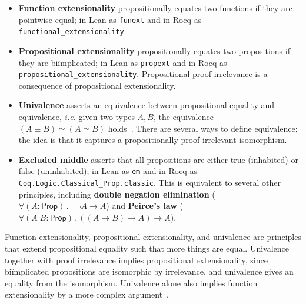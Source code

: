 \documentclass{article}
\makeatletter
\newcommand{\ie}{\textit{i.e.}\@\xspace}
\newcommand{\kw}[1]{\mathsf{#1}}
\newcommand{\code}[1]{\texttt{#1}}
\makeatother
\begin{document}
\begin{itemize}[noitemsep,topsep=0pt]
  \item \textbf{Function extensionality}
    propositionally equates two functions if they are pointwise equal;
    in Lean as \code{funext} and in Rocq as \code{functional\_extensionality}.
  \item \textbf{Propositional extensionality}
    propositionally equates two propositions if they are bi\"implicated;
    in Lean as \code{propext} and in Rocq as \code{propositional\_extensionality}.
    Propositional proof irrelevance is a consequence of propositional extensionality.
  \item \textbf{Univalence}
    asserts an equivalence between propositional equality and equivalence,
    \ie given two types $A, B$,
    the equivalence $(A \equiv B) \simeq (A \simeq B)$ holds~\citep{hott}.
    There are several ways to define equivalence;
    the idea is that it captures a propositionally proof-irrelevant isomorphism.
  \item \textbf{Excluded middle}
    asserts that all propositions are either true (inhabited) or false (uninhabited);
    in Lean as \code{em} and in Rocq as \code{Coq.Logic.Classical\_Prop.classic}.
    This is equivalent to several other principles,
    including \textbf{double negation elimination}
    ($\forall (A : \kw{Prop})\mathpunct{.} \neg \neg A \to A$)
    and \textbf{Peirce's law}
    ($\forall (A \; B : \kw{Prop})\mathpunct{.} ((A \to B) \to A) \to A$).
\end{itemize}

Function extensionality, propositional extensionality, and univalence
are principles that extend propositional equality such that more things are equal.
Univalence together with proof irrelevance implies propositional extensionality,
since bi\"implicated propositions are isomorphic by irrelevance,
and univalence gives an equality from the isomorphism.
Univalence alone also implies function extensionality
by a more complex argument~\cite[Chapter 4.9]{hott}.
\end{document}
